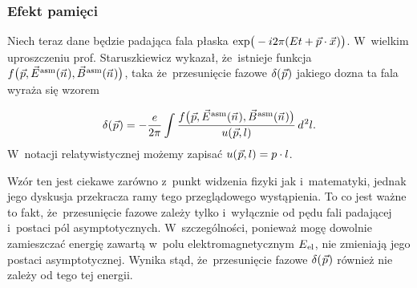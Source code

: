 \documentclass[10pt,t]{beamer}
\begin{document}
\begin{frame}
  \frametitle{Efekt pamięci}


  Niech teraz dane będzie padająca fala płaska
  $\exp\!\big( -i 2\pi ( E t + \vec{p} \cdot \vec{x} \hspace{0.05em} ) \big)$. W~wielkim
  uproszczeniu prof. Staruszkiewicz wykazał, że~istnieje funkcja
  $f\big( \hspace{0.05em} \vec{p}, \vec{E}^{ \hspace{0.05em} \text{asm} }( \vec{n} \hspace{0.05em} ), \vec{B}^{ \hspace{0.05em} \text{asm} }( \vec{n} \hspace{0.05em} ) \big)$, taka
  że~przesunięcie fazowe $\delta( \hspace{0.05em} \vec{p} \hspace{0.05em} )$ jakiego
  dozna ta fala wyraża się wzorem

  \vspace{-1em}


  \begin{equation}
    \label{eq:Pola-asymptotyczne-i-efekt-pamieci-01}
    \delta( \hspace{0.05em} \vec{p} \hspace{0.05em} ) =
    -\frac{ e }{ 2\pi }
    \int \frac{ f\big( \hspace{0.05em} \vec{p}, \vec{E}^{ \hspace{0.05em} \text{asm} }( \vec{n} \hspace{0.05em} ),
      \vec{B}^{ \hspace{0.05em} \text{asm} }( \vec{n} \hspace{0.05em} ) \big) }{ u( \hspace{0.05em} \vec{p}, l ) } \,
    d^{ \hspace{0.05em} 2 } l.
  \end{equation}
  W~notacji relatywistycznej możemy zapisać
  $u( \hspace{0.05em} \vec{p}, l ) = p \cdot l$.

  Wzór ten jest ciekawe zarówno z~punkt widzenia fizyki jak i~matematyki,
  jednak jego dyskusja przekracza ramy tego przeglądowego wystąpienia. To co
  jest ważne to fakt, że~przesunięcie fazowe zależy \alert{tylko
    i~wyłącznie} od pędu fali padającej i~postaci pól asymptotycznych.
  W~szczególności, ponieważ mogę dowolnie zamieszczać energię zawartą
  w~polu elektromagnetycznym $E_{ \hspace{0.05em} \text{el} }$, nie zmieniają jego
  postaci asymptotycznej. Wynika stąd, że~przesunięcie fazowe
  $\delta( \hspace{0.05em} \vec{p} \hspace{0.05em} )$ również nie zależy od tego tej
  energii.

\end{frame}
\end{document}
